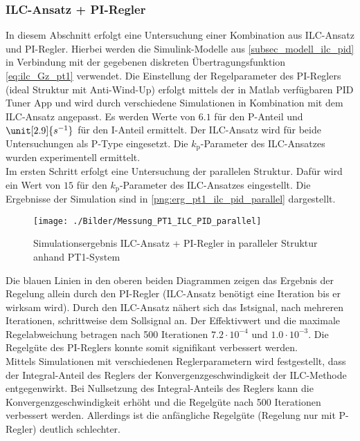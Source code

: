 \subsubsection{ILC-Ansatz + PI-Regler}
\label{subsubsec_ILC_PID}
In diesem Abschnitt erfolgt eine Untersuchung einer Kombination aus ILC-Ansatz und PI-Regler. Hierbei werden die Simulink-Modelle aus \autoref{subsec_modell_ilc_pid} in Verbindung mit der gegebenen diskreten Übertragungsfunktion \autoref{eq:ilc_Gz_pt1} verwendet. Die Einstellung der Regelparameter des PI-Reglers (ideal Struktur mit Anti-Wind-Up) erfolgt mittels der in Matlab verfügbaren PID Tuner App und wird durch verschiedene Simulationen in Kombination mit dem ILC-Ansatz angepasst. Es werden Werte von $6.1$ für den P-Anteil und $\unit[2.9]{s^{-1}}$ für den I-Anteil ermittelt. Der ILC-Ansatz wird für beide Untersuchungen als P-Type eingesetzt. Die $k_\mathrm{p}$-Parameter des ILC-Ansatzes wurden experimentell ermittelt.\\
Im ersten Schritt erfolgt eine Untersuchung der parallelen Struktur. Dafür wird ein Wert von $15$ für den $k_\mathrm{p}$-Parameter des ILC-Ansatzes eingestellt. Die Ergebnisse der Simulation sind in \autoref{png:erg_pt1_ilc_pid_parallel} dargestellt.
\begin{figure}[H]
	\centering
	\texttt{[image: ./Bilder/Messung\_PT1\_ILC\_PID\_parallel]}
	\caption{Simulationsergebnis ILC-Ansatz + PI-Regler in paralleler Struktur anhand PT1-System}
	\label{png:erg_pt1_ilc_pid_parallel}
\end{figure}
Die blauen Linien in den oberen beiden Diagrammen zeigen das Ergebnis der Regelung allein durch den PI-Regler (ILC-Ansatz benötigt eine Iteration bis er wirksam wird). Durch den ILC-Ansatz nähert sich das Istsignal, nach mehreren Iterationen, schrittweise dem Sollsignal an. Der Effektivwert und die maximale Regelabweichung betragen nach 500 Iterationen $7.2\cdot 10^{-4}$ und $1.0\cdot10^{-3}$. Die Regelgüte des PI-Reglers konnte somit signifikant verbessert werden.\\
Mittels Simulationen mit verschiedenen Reglerparametern wird festgestellt, dass der Integral-Anteil des Reglers der Konvergenzgeschwindigkeit der ILC-Methode entgegenwirkt. Bei Nullsetzung des Integral-Anteils des Reglers kann die Konvergenzgeschwindigkeit erhöht und die Regelgüte nach 500 Iterationen verbessert werden. Allerdings ist die anfängliche Regelgüte (Regelung nur mit P-Regler) deutlich schlechter.\\
\\
